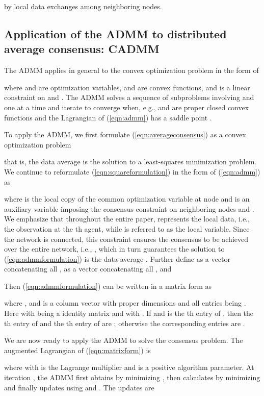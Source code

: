 \documentclass[journal]{IEEEtran}
\begin{document}
by local data exchanges among neighboring nodes.

\subsection{Application of the ADMM to distributed average consensus: CADMM}
The ADMM applies in general to the convex optimization problem in the form of 

where  and  are optimization variables,  and  are convex functions, and  is a linear constraint on  and . The ADMM solves a sequence of subproblems involving  and  one at a time and iterate to converge when, e.g.,  and  are proper closed convex functions and the Lagrangian of (\ref{eqn:admm}) has a saddle point \cite{BoydADMM}. 

To apply the ADMM, we first formulate (\ref{eqn:averageconsensus}) as a convex optimization problem
 
that is, the data average is the solution to a least-squares minimization problem. We continue to reformulate (\ref{eqn:squareformulation}) in the form of (\ref{eqn:admm}) as

where  is the local copy of the common optimization variable  at node  and  is an auxiliary variable imposing the consensus constraint on neighboring nodes  and . We emphasize that throughout the entire paper,  represents the local data, i.e., the observation at the th agent, while  is referred to as the local variable. Since the network is connected, this constraint ensures the consensus to be achieved over the entire network, i.e., , which in turn guarantees the solution to (\ref{eqn:admmformulation}) is the data average . Further define  as a vector concatenating all ,  as a vector concatenating all , and 

Then (\ref{eqn:admmformulation}) can be written in a matrix form as 

where , and  is a column vector with proper dimensions and all entries being . Here  with  being a  identity matrix and  with . If  and  is the th entry of , then the th entry of  and the th entry of  are ; otherwise the corresponding entries are . 

We are now ready to apply the ADMM to solve the consensus problem. The augmented Lagrangian of (\ref{eqn:matrixform}) is 

where  with  is the Lagrange multiplier and  is a positive algorithm parameter. At iteration , the ADMM first obtains  by minimizing , then calculates  by minimizing  and finally updates  using  and . The updates are 
 
\end{document}
